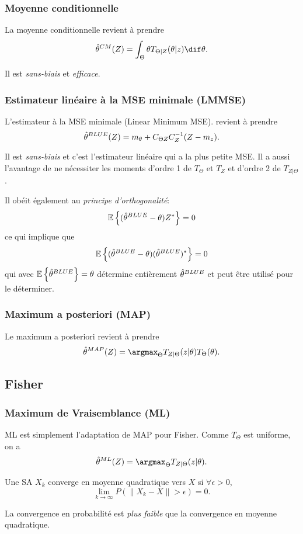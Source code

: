 \subsubsection{Moyenne conditionnelle}
La moyenne conditionnelle revient à prendre
\[ \esthcm(Z) = \int_{\Theta} \theta T_{\Theta|Z}(\theta|z) \dif \theta. \]

Il est \emph{sans-biais} et \emph{efficace}.

\subsubsection{Estimateur linéaire à la MSE minimale (LMMSE)}
L'estimateur à la MSE minimale (Linear Minimum MSE).
revient à prendre
\[ \hat{\theta}^{BLUE}(Z) = m_\theta + C_{\Theta Z} C_{Z}^{-1}(Z - m_z). \]

Il est \emph{sans-biais} et c'est l'estimateur linéaire
qui a la plus petite MSE.
Il a aussi l'avantage de ne nécessiter les moments d'ordre
1 de $T_\Theta$ et $T_Z$ et d'ordre 2 de $T_{Z|\Theta}$.

Il obéit également au \emph{principe d'orthogonalité}:
\[ \mathbb{E}\left\{(\hat{\theta}^{BLUE} - \theta)Z^*\right\} = 0 \]
ce qui implique que
\[ \mathbb{E}\left\{(\hat{\theta}^{BLUE} - \theta)(\hat{\theta}^{BLUE})^*\right\} = 0 \]
qui avec $\mathbb{E}\left\{\hat{\theta}^{BLUE}\right\} = \theta$ détermine entièrement
$\hat{\theta}^{BLUE}$ et peut être utilisé pour le déterminer.

\subsubsection{Maximum a posteriori (MAP)}
Le maximum a posteriori revient à prendre
\[ \esthmap(Z) = \argmax_{\Theta} T_{Z|\Theta}(z|\theta) T_{\Theta}(\theta). \]

\subsection{Fisher}
\subsubsection{Maximum de Vraisemblance (ML)}
ML est simplement l'adaptation de MAP pour Fisher.
Comme $T_{\Theta}$ est uniforme, on a
\[ \esthml(Z) = \argmax_{\Theta} T_{Z|\Theta}(z|\theta). \]

\begin{mydef}
  Une SA $X_k$ converge en moyenne quadratique vers $X$ si
  $\forall \epsilon > 0$,
\[ \lim_{k\to\infty} P(\|X_k-X\| > \epsilon) = 0. \]
\end{mydef}
La convergence en probabilité est \emph{plus faible} que la convergence en moyenne quadratique.

